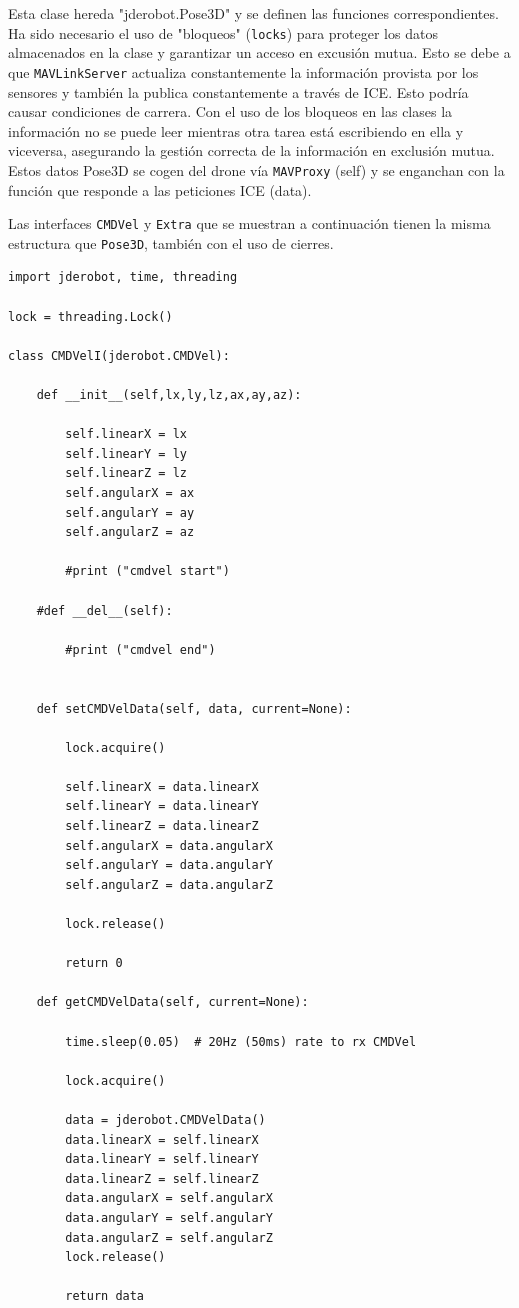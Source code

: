 \clearpage
Esta clase hereda "jderobot.Pose3D" y se definen las funciones correspondientes. Ha sido necesario el uso de "bloqueos" (\texttt{locks}) para proteger los datos almacenados en la clase y garantizar un acceso en excusión mutua. Esto se debe a que \texttt{MAVLinkServer} actualiza constantemente la información provista por los sensores y también la publica constantemente a través de ICE. Esto podría causar condiciones de carrera. Con el uso de los bloqueos en las clases la información no se puede leer mientras otra tarea está escribiendo en ella y viceversa, asegurando la gestión correcta de la información en exclusión mutua. Estos datos Pose3D se cogen del drone vía \texttt{MAVProxy} (self) y se enganchan con la función que responde a las peticiones ICE (data).

Las interfaces \texttt{CMDVel} y \texttt{Extra} que se muestran a continuación tienen la misma estructura que \texttt{Pose3D}, también con el uso de cierres.

\begin{lstlisting}[frame=single]
import jderobot, time, threading

lock = threading.Lock()

class CMDVelI(jderobot.CMDVel):

    def __init__(self,lx,ly,lz,ax,ay,az):

        self.linearX = lx
        self.linearY = ly
        self.linearZ = lz
        self.angularX = ax
        self.angularY = ay
        self.angularZ = az

        #print ("cmdvel start")

    #def __del__(self):

        #print ("cmdvel end")


    def setCMDVelData(self, data, current=None):

        lock.acquire()

        self.linearX = data.linearX
        self.linearY = data.linearY
        self.linearZ = data.linearZ
        self.angularX = data.angularX
        self.angularY = data.angularY
        self.angularZ = data.angularZ

        lock.release()

        return 0

    def getCMDVelData(self, current=None):

        time.sleep(0.05)  # 20Hz (50ms) rate to rx CMDVel

        lock.acquire()

        data = jderobot.CMDVelData()
        data.linearX = self.linearX
        data.linearY = self.linearY
        data.linearZ = self.linearZ
        data.angularX = self.angularX
        data.angularY = self.angularY
        data.angularZ = self.angularZ
        lock.release()

        return data
        
\end{lstlisting} 


